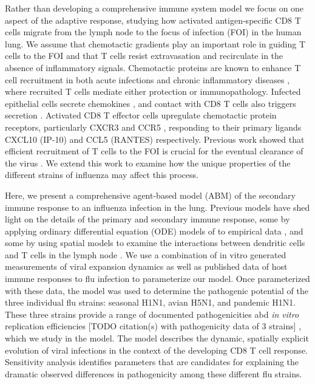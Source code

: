 \documentclass[10pt]{article}
\begin{document}
Rather than developing a comprehensive immune system model we focus on one aspect of the adaptive response, studying how activated antigen-specific CD8 T cells migrate from the lymph node to the focus of infection (FOI) in the human lung.  We assume that chemotactic gradients play an important role in guiding T cells to the FOI and that T cells resist extravasation and recirculate in the absence of inflammatory signals.  Chemotactic proteins are known to enhance T cell recruitment in both acute infections and chronic inflammatory diseases \cite{Bromley2008, Medoff2005, Castellino2006 ,Gunn1998, Okada2005}, where recruited T cells mediate either protection or immunopathology.  Infected epithelial cells secrete chemokines \cite{Chan2005}, and contact with CD8 T cells also triggers secretion \cite{Zhao2000}. Activated CD8 T effector cells upregulate chemotactic protein receptors, particularly CXCR3 and CCR5 \cite{Hoji2005, Groom2011a}, responding to their primary ligands CXCL10 (IP-10) and CCL5 (RANTES) respectively.  Previous work showed that efficient recruitment of T cells to the FOI is crucial for the eventual clearance of the virus \cite{Cerwenka1999, Kim2011}.  We extend this work to examine how the unique properties of the different strains of influenza may affect this process.

Here, we present a comprehensive agent-based model (ABM) of the secondary immune response to an influenza infection in the lung.  Previous models have shed light on the details of the primary and secondary immune response, some by applying ordinary differential equation (ODE) models of to empirical data \cite{Miao2010, Saenz2010, Handel2008, Lee2009}, and some by using spatial models to examine the interactions between dendritic cells and T cells in the lymph node \cite{Beltman2007, Zheng2008}.  We use a combination of in vitro generated measurements of viral expansion dynamics as well as published data of host immune responses to flu infection to parameterize our model.  Once parameterized with these data, the model was used to determine the pathogenic potential of the three individual flu strains: seasonal H1N1, avian H5N1, and pandemic H1N1.  These three strains provide a range of documented pathogenicities abd \textit{in vitro} replication efficiencies [TODO citation(s) with pathogenicity data of 3 strains] \cite{Mitchell2011}, which we study in the model.  The model describes the dynamic, spatially explicit evolution of viral infections in the context of the developing CD8 T cell response.  Sensitivity analysis identifies parameters that are candidates for explaining the dramatic observed differences in pathogenicity among these different flu strains.
\end{document}

